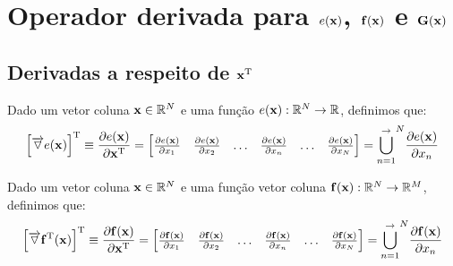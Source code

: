 
\section{Operador derivada para $e(\VECTOR{x})$, $\VECTOR{f}(\VECTOR{x})$ e  $\MATRIX{G}(\VECTOR{x})$}

\subsection{Derivadas a respeito de $\VECTOR{x}^{\transpose}$}

\begin{definition}\label{def:deltahor}
Dado 
um vetor coluna $\VECTOR{x}\in \mathbb{R}^N$ e 
uma função $e(\VECTOR{x}): \mathbb{R}^N \rightarrow \mathbb{R}$,
definimos que:
\begin{equation}
\left[\overrightarrow{\triangledown} e(\VECTOR{x})\right]^{\transpose} \equiv 
\frac{\partial e(\VECTOR{x}) }{\partial \VECTOR{x}^{\transpose}}= 
\left[
\begin{matrix}
\frac{\partial e(\VECTOR{x}) }{\partial x_{1}}&
\frac{\partial e(\VECTOR{x}) }{\partial x_{2}}&
\hdots&
\frac{\partial e(\VECTOR{x}) }{\partial x_{n}}&
\hdots&
\frac{\partial e(\VECTOR{x}) }{\partial x_{N}}
\end{matrix}
\right]= {\bigcup\limits_{n=1}^{\rightarrow}}^{N}{\frac{\partial e(\VECTOR{x}) }{\partial x_{n}}} 
\end{equation}
\end{definition}

\begin{definition}\label{def:deltahor2}
Dado 
um vetor coluna $\VECTOR{x}\in \mathbb{R}^N$ e 
uma função vetor coluna $\VECTOR{f}(\VECTOR{x}): \mathbb{R}^N \rightarrow \mathbb{R}^M$, 
definimos que:
\begin{equation}
\left[\overrightarrow{\triangledown} \VECTOR{f}^{\transpose}(\VECTOR{x})\right]^{\transpose} \equiv 
\frac{\partial \VECTOR{f}(\VECTOR{x}) }{\partial \VECTOR{x}^{\transpose}}= 
\left[
\begin{matrix}
\frac{\partial \VECTOR{f}(\VECTOR{x}) }{\partial x_{1}}&
\frac{\partial \VECTOR{f}(\VECTOR{x}) }{\partial x_{2}}&
\hdots&
\frac{\partial \VECTOR{f}(\VECTOR{x}) }{\partial x_{n}}&
\hdots&
\frac{\partial \VECTOR{f}(\VECTOR{x}) }{\partial x_{N}}
\end{matrix}
\right]= {\bigcup\limits_{n=1}^{\rightarrow}}^{N}{\frac{\partial \VECTOR{f}(\VECTOR{x}) }{\partial x_{n}}} 
\end{equation}
\end{definition}

